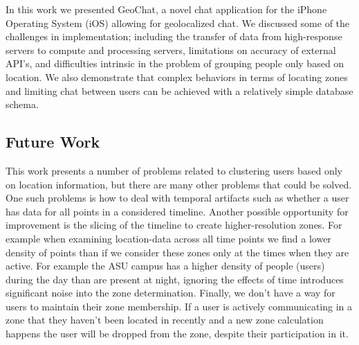 In this work we presented GeoChat, a novel chat application for the iPhone Operating System (iOS) allowing for geolocalized chat.  We discussed some of the challenges in implementation; including the transfer of data from high-response servers to compute and processing servers, limitations on accuracy of external API's, and difficulties intrinsic in the problem of grouping people only based on location.  We also demonstrate that complex behaviors in terms of locating zones and limiting chat between users can be achieved with a relatively simple database schema.

\subsection{Future Work}
This work presents a number of problems related to clustering users based only on location information, but there are many other problems that could be solved.  One such problems is how to deal with temporal artifacts such as whether a user has data for all points in a considered timeline.  Another possible opportunity for improvement is the slicing of the timeline to create higher-resolution zones.  For example when examining location-data across all time points we find a lower density of points than if we consider these zones only at the times when they are active.  For example the ASU campus has a higher density of people (users) during the day than are present at night, ignoring the effects of time introduces significant noise into the zone determination.  Finally, we don't have a way for users to maintain their zone membership.  If a user is actively communicating in a zone that they haven't been located in recently and a new zone calculation happens the user will be dropped from the zone, despite their participation in it.
